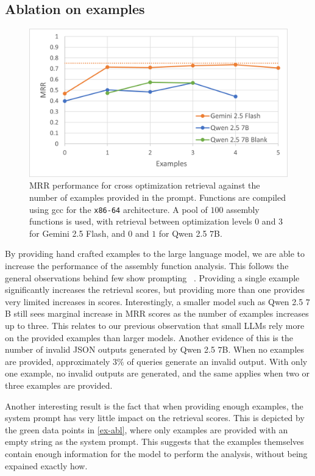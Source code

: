\subsection{Ablation on examples}

\begin{figure}
\centerline{\includegraphics[width=\linewidth]{examples-ablation}}
\caption{MRR performance for cross optimization retrieval against the number of examples provided in the prompt. Functions are compiled
using gcc for the \texttt{x86-64} architecture. A pool of \(100\) assembly functions is used, with retrieval between optimization levels \(0\) and \(3\)
for Gemini 2.5 Flash, and \(0\) and \(1\) for Qwen 2.5 \(7\)B.}
\label{ex-abl}
\end{figure}

By providing hand crafted examples to the large language model, we are able to increase the performance of the assembly function analysis.
This follows the general observations behind few show prompting ~\cite{few-shot}. Providing a single example significantly increases the retrieval
scores, but providing more than one provides very limited increases in scores. Interestingly, a smaller model such as Qwen 2.5 \(7\)B still sees
marginal increase in MRR scores as the number of examples increases up to three. This relates to our previous observation
that small LLMs rely more on the provided examples than larger models. Another evidence of this is the number of invalid JSON outputs generated by
Qwen 2.5 \(7\)B. When no examples are provided, approximately \(3\%\) of queries generate an invalid output. With only one example, no invalid
outputs are generated, and the same applies when two or three examples are provided.

Another interesting result is the fact that when providing enough examples, the system prompt has very little impact on the retrieval scores.
This is depicted by the green data points in \autoref{ex-abl}, where only examples are provided with an empty string as the system prompt.
This suggests that the examples themselves contain enough information for the model to perform the analysis, without being expained 
exactly how.

